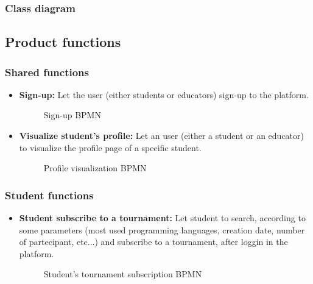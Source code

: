 \documentclass{article}
\begin{document}
{        \subsubsection{Class diagram}
\subsection{Product functions}
    \subsubsection{Shared functions}
        \begin{itemize}
            \item \textbf{Sign-up:} Let the user (either students or educators) sign-up to the platform.
            \begin{figure}[H]
                \centering
                \caption{Sign-up BPMN}
                \label{fig:signUpBPMN}
            \end{figure}

            \item \textbf{Visualize student's profile:} Let an user (either a student or an educator) to visualize the profile page of a specific student.
            \begin{figure}[H]
                \centering
                \caption{Profile visualization BPMN}
                \label{fig:profileVisualizationBPMN}
            \end{figure}
        \end{itemize}

    \subsubsection{Student functions}
        \begin{itemize}
            \item \textbf{Student subscribe to a tournament:} Let student to search, according to some parameters (most used programming languages, creation date, number of partecipant, etc...) and subscribe to a tournament, after loggin in the platform.
            \begin{figure}[H]
                \centering
                \caption{Student's tournament subscription BPMN}
                \label{fig:studTournamentSubBPMN}
            \end{figure}


\end{itemize}}
\end{document}

